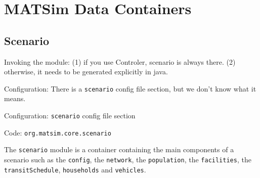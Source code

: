 \section{MATSim Data Containers}
\label{sec:matsim-containers}
\subsection{Scenario}
\label{sec:scenario}

\begin{compactitem}
\item Invoking the module: (1) if you use Controler, scenario is always there. (2) otherwise, it needs to be generated explicitly in java.  

\item Configuration: There is a \lstinline|scenario| config file section, but we don't know what it means. 

\item Configuration: \lstinline|scenario| config file section 

\item Code: \lstinline|org.matsim.core.scenario|
\end{compactitem}

The \lstinline|scenario| module is
a container containing the main components of a scenario such as the \lstinline|config|, the \lstinline|network|, the \lstinline|population|, the \lstinline|facilities|, the \lstinline|transitSchedule|, \lstinline|households| and \lstinline|vehicles|.

